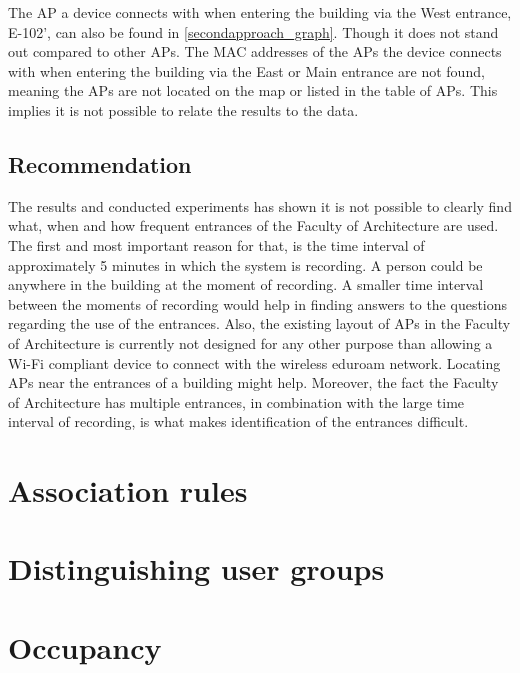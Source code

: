 The AP a device connects with when entering the building via the West entrance, E-102', can also be found in \autoref{secondapproach_graph}. Though it does not stand out compared to other APs. The MAC addresses of the APs the device connects with when entering the building via the East or Main entrance are not found, meaning the APs are not located on the map or listed in the table of APs. This implies it is not possible to relate the results to the data. 
\subsection{Recommendation}
The results and conducted experiments has shown it is not possible to clearly find what, when and how frequent entrances of the Faculty of Architecture are used. The first and most important reason for that, is the time interval of approximately 5 minutes in which the system is recording. A person could be anywhere in the building at the moment of recording. A smaller time interval between the moments of recording would help in finding answers to the questions regarding the use of the entrances. Also, the existing layout of APs in the Faculty of Architecture is currently not designed for any other purpose than allowing a Wi-Fi compliant device to connect with the wireless eduroam network. Locating APs near the entrances of a building might help. Moreover, the fact the Faculty of Architecture has multiple entrances, in combination with the large time interval of recording, is what makes identification of the entrances difficult. 
\section{Association rules} 

\section{Distinguishing user groups}

\section{Occupancy}

